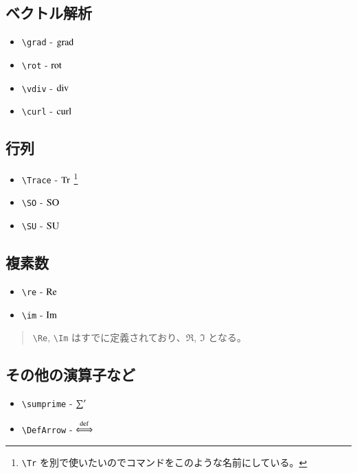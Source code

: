 \documentclass[oneside,10pt,a4paper]{jsarticle}
\begin{document}
  \subsection{ベクトル解析}

  \begin{itemize}
    \item \verb|\grad| - $ \operatorname{grad} $
    \item \verb|\rot| - $ \operatorname{rot} $
    \item \verb|\vdiv| - $ \operatorname{div} $
    \item \verb|\curl| - $ \operatorname{curl} $
  \end{itemize}

  \subsection{行列}

  \begin{itemize}
    \item \verb|\Trace| - $ \operatorname{Tr} $ \footnote{\verb|\Tr| を別で使いたいのでコマンドをこのような名前にしている。}
    \item \verb|\SO| - $ \operatorname{SO} $
    \item \verb|\SU| - $ \operatorname{SU} $
  \end{itemize}

  \newpage

  \subsection{複素数}

  \begin{itemize}
    \item \verb|\re| - $ \operatorname{Re} $
    \item \verb|\im| - $ \operatorname{Im} $
  \end{itemize}

  \Remark
  \begin{quote}
    \verb|\Re|, \verb|\Im| はすでに定義されており、$ \Re $, $ \Im $ となる。
  \end{quote}

  \subsection{その他の演算子など}

  \begin{itemize}
    \item \verb|\sumprime| - $ \operatorname*{{\sum}^{\prime}} $
    \item \verb|\DefArrow| - $ \operatorname{{\stackrel{\mathrm{def}}{\Longleftrightarrow}}} $
  \end{itemize}
\end{document}
